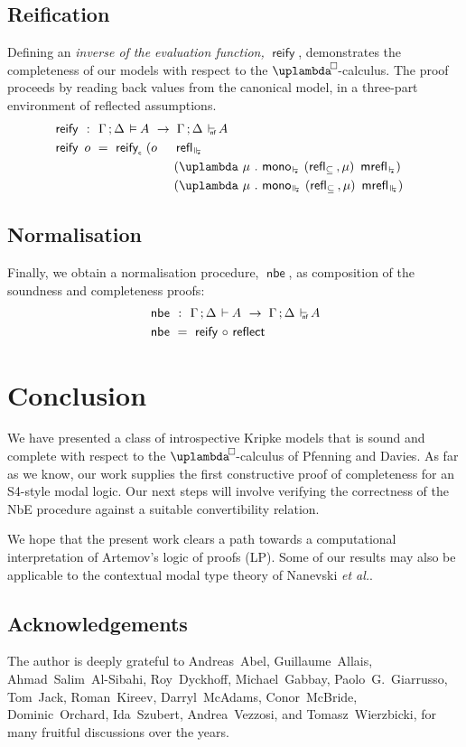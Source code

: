 \documentclass[submission,copyright,creativecommons,sharealike,backref=page]{eptcs}
\newcommand{\uplambdabox}{\uplambda^{\mkern-3mu\Box\mkern-3mu}}
\newcommand{\sA}{\mkern-2muA}
\renewcommand{\leq}{\mathrel{\subseteq}}
\renewcommand{\:}{\mathop{\mkern3mu:\mkern3mu}}
\renewcommand{\.}{\mathop{\mkern3mu.\mkern3mu}}
\renewcommand{\;}{\mathop{;}}
\renewcommand{\,}{\mathop{,}}
\renewcommand{\o}{\mathop{\mkern3mu\circ\mkern3mu}}
\newcommand{\e}{\mathrel{\mkern2mu\vdash\mkern1mu}}
\newcommand{\enf}{\mathrel{\mkern2mu\vdash_{\mkern-9mu\scriptscriptstyle{\textsf{nf}}}}}
\newcommand{\es}{\mathrel{\mkern2mu\vdash_{\mkern-9mu\scriptscriptstyle{\star}}}}
\newcommand{\ees}{\mathrel{\mkern2mu\Vdash_{\mkern-9mu\scriptscriptstyle{\star}}}}
\newcommand{\ef}{\mathrel{\mkern2mu\vDash\mkern1mu}}
\renewcommand{\r}{\mathrel{\rightarrow\mkern-1mu}}
\newcommand{\reflect}{\operatorname{\textsf{reflect}}}
\newcommand{\reify}{\operatorname{\textsf{reify}}}
\newcommand{\reifyc}{\operatorname{\textsf{reify}_{\scriptscriptstyle{\textsf{c}}}}}
\newcommand{\nbe}{\operatorname{\textsf{nbe}}}
\newcommand{\monoes}{\operatorname{\textsf{mono}_{\es}}}
\newcommand{\monoees}{\operatorname{\textsf{mono}_{\ees}}}
\newcommand{\reflleq}{\operatorname{\textsf{refl}_{\leq}}}
\newcommand{\mrefles}{\operatorname{\textsf{mrefl}_{\es}}}
\newcommand{\reflees}{\operatorname{\textsf{refl}_{\ees}}}
\newcommand{\mreflees}{\operatorname{\textsf{mrefl}_{\ees}}}
\theoremstyle{mystyle}
\begin{document}
\subsection{Reification}

Defining an \emph{inverse of the evaluation function,} $\reify$, demonstrates the completeness of our models with respect to the $\uplambdabox$-calculus.  The proof proceeds by reading back values from the canonical model, in a three-part environment of reflected assumptions.
\begin{alignat*}{2}
  & \reify ~\:~ \rlap{$\Gamma \; \Delta \ef \sA ~\r~ \Gamma \; \Delta \enf \sA$}\\
  & \reify~o ~=~ \reifyc~(o~ && \reflees\\
  &                          && (\uplambda~\mu \. \monoes~(\reflleq \, \mu)~\mrefles)\\
  &                          && (\uplambda~\mu \. \monoees~(\reflleq \, \mu)~\mreflees)
\end{alignat*}


\subsection{Normalisation}

Finally, we obtain a normalisation procedure, $\nbe$, as composition of the soundness and completeness proofs:
\begin{align*}
  & \nbe ~\:~ \Gamma \; \Delta \e \sA ~\r~ \Gamma \; \Delta \enf \sA\\
  & \nbe ~=~ \reify \o \reflect
\end{align*}


\section*{Conclusion}

We have presented a class of introspective Kripke models that is sound and complete with respect to the $\uplambdabox$-calculus of Pfenning and Davies\cite{PfenningD01}.  As far as we know, our work supplies the first constructive proof of completeness for an S4-style modal logic.  Our next steps will involve verifying the correctness of the NbE procedure against a suitable convertibility relation.

We hope that the present work clears a path towards a computational interpretation of Artemov's\cite{Artemov01} logic of proofs (LP).  Some of our results may also be applicable to the contextual modal type theory of Nanevski \emph{et al.}\cite{NanevskiPP08}.


\subsection*{Acknowledgements}

The author is deeply grateful to Andreas~Abel, Guillaume~Allais, Ahmad~Salim~Al-Sibahi, Roy~Dyckhoff, Michael~Gabbay, Paolo~G.~Giarrusso, Tom~Jack, Roman~Kireev, Darryl~McAdams, Conor~McBride, Dominic~Orchard, Ida~Szubert, Andrea~Vezzosi, and Tomasz~Wierzbicki, for many fruitful discussions over the years.

\nocite{*}
% 


\end{document}
